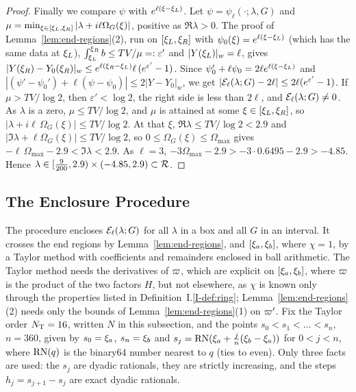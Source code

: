 \begin{proof}
Finally we compare $\psi$ with $e^{\ell(\xi-\xi_L)}$. Let $\psi=\psi_\ell(\cdot;\lambda,G)$ and
$\mu=\min_{\xi\in[\xi_L,\xi_R]}|\lambda+i\ell\Omega_G(\xi)|$, positive as $\Re\lambda>0$. The proof of
Lemma~\ref{lem:end-regions}(2), run on $[\xi_L,\xi_R]$ with
$\psi_0(\xi)=e^{\ell(\xi-\xi_L)}$ (which has the same data at $\xi_L$),
$\int_{\xi_L}^{\xi_R}b\le TV/\mu=:\varepsilon'$ and $|Y(\xi_L)|_w=\ell$, gives
$|Y(\xi_R)-Y_0(\xi_R)|_w\le e^{\ell(\xi_R-\xi_L)}\ell\,(e^{\varepsilon'}-1)$. Since
$\psi_0'+\ell\psi_0=2\ell e^{\ell(\xi-\xi_L)}$ and
$|(\psi'-\psi_0')+\ell(\psi-\psi_0)|\le2|Y-Y_0|_w$, we get
$|\mathcal{E}_\ell(\lambda;G)-2\ell|\le2\ell(e^{\varepsilon'}-1)$. If $\mu>TV/\log2$, then
$\varepsilon'<\log2$, the right side is less than $2\ell$, and
$\mathcal{E}_\ell(\lambda;G)\ne0$. As $\lambda$ is a zero, $\mu\le TV/\log2$, and $\mu$ is attained at some
$\xi\in[\xi_L,\xi_R]$, so $|\lambda+i\ell\,\Omega_G(\xi)|\le TV/\log2$. At that $\xi$,
$\Re\lambda\le TV/\log2<2.9$ and $|\Im\lambda+\ell\Omega_G(\xi)|\le TV/\log2$, so
$0\le\Omega_G(\xi)\le\Omega_{\max}$ gives $-\ell\,\Omega_{\max}-2.9<\Im\lambda<2.9$. As
$\ell=3$, $-3\Omega_{\max}-2.9>-3\cdot0.6495-2.9>-4.85$. Hence
$\lambda\in[\frac9{200},2.9)\times(-4.85,2.9)\subset\mathcal{R}$.
\end{proof}

\subsection{The Enclosure Procedure}
\label{app:procedure}

The procedure encloses $\mathcal{E}_\ell(\lambda;G)$ for all $\lambda$ in a box and
all $G$ in an interval. It crosses the end regions by
Lemma~\ref{lem:end-regions}, and $[\xi_a,\xi_b]$, where $\chi=1$, by a Taylor
method with coefficients and remainders enclosed in ball arithmetic. The Taylor
method needs the derivatives of $\varpi$, which are explicit on $[\xi_a,\xi_b]$, where
$\varpi$ is the product of the two factors $H$, but not elsewhere, as $\chi$ is known
only through the properties listed in Definition~I.\ref{I-def:ring};
Lemma~\ref{lem:end-regions}(2) needs only the bounds of
Lemma~\ref{lem:end-regions}(1) on $\varpi'$. Fix the
Taylor order $N_{\mathrm{T}}=16$, written $N$ in this subsection, and the points $s_0<s_1<\dots<s_n$, $n=360$, given by
$s_0=\xi_a$, $s_n=\xi_b$ and $s_j=\operatorname{RN}(\xi_a+\frac jn(\xi_b-\xi_a))$ for $0<j<n$, where
$\operatorname{RN}(q)$ is the binary64 number nearest to $q$ (ties to even). Only three facts are
used: the $s_j$ are dyadic rationals, they are strictly increasing, and the steps
$h_j=s_{j+1}-s_j$ are exact dyadic rationals.

